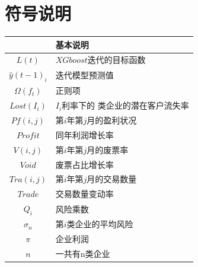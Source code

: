 \documentclass[UTF8]{ctexart}
\begin{document}
\section{符号说明}
\begin{table}[H]
	\begin{center}
		\begin{tabular}{c|l}
			\toprule[2pt]
			\rowcolor[gray]{0.8}

			\multicolumn{1}{m{8em}}{\centering 符号} & \multicolumn{1}{m{30em}}{\centering 基本说明} \\


			\midrule[1.3pt]
			$L(t)$                                   & $XGboost$迭代的目标函数                       \\
			$\hat{y}(t-1)_i$                         & 迭代模型预测值                                \\
			$\Omega (f_t)$                           & 正则项                                        \\
			$Lost(I_i)$                              & $I_i$利率下的 类企业的潜在客户流失率          \\
			$Pf(i,j)$                                & 第$i$年第$j$月的盈利状况                      \\
			$Profit$                                 & 同年利润增长率                                \\
			$V(i,j)$                                 & 第$i$年第$j$月的废票率                        \\
			$Void$                                   & 废票占比增长率                                \\
			$Tra(i,j)$                               & 第$i$年第$j$月的交易数量                      \\
			$Trade$                                  & 交易数量变动率                                \\
			$Q_i$                                    & 风险乘数                                      \\
			$\sigma _n$                              & 第$i$类企业的平均风险                         \\
			$\pi $                                   & 企业利润                                      \\
			$n$                                      & 一共有n类企业                                 \\

\end{tabular}
\end{center}
\end{table}
\end{document}
